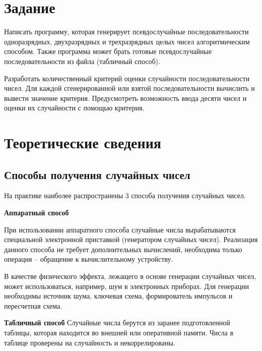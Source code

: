\documentclass[14pt, a4paper]{extarticle}
\begin{document}


\setcounter{page}{2}

\section{Задание}

Написать программу, которая генерирует псевдослучайные последовательности одноразрядных, двухразрядных и трехразрядных целых чисел алгоритмическим способом. Также программа может брать готовые псевдослучайные последовательности из файла (табличный способ).

Разработать количественный критерий оценки случайности последовательности чисел. Для каждой сгенерированной или взятой последовательности вычислить и вывести значение критерия. 
Предусмотреть возможность ввода десяти чисел и оценки их случайности с помощью критерия.


\section{Теоретические сведения}

\subsection{Способы получения случайных чисел}

На практике наиболее распространены 3 способа получения случайных чисел.

\textbf{Аппаратный способ}

При использовании аппаратного способа случайные числа вырабатываются специальной электронной приставкой (генератором случайных чисел). Реализация данного способа не требует дополнительных вычислений, необходима только операция -- обращение к вычислительному устройству. 

В качестве физического эффекта, лежащего в основе генерации случайных чисел, может использоваться, например, шум в электронных приборах.  Для генерации необходимы источник шума, ключевая схема, формирователь импульсов и пересчетная схема.



\textbf{Табличный способ}
Случайные числа берутся из заранее подготовленной таблицы, которая находится во внешней или оперативной памяти. Числа в таблице проверены на случайность и некоррелированы.
\end{document}
